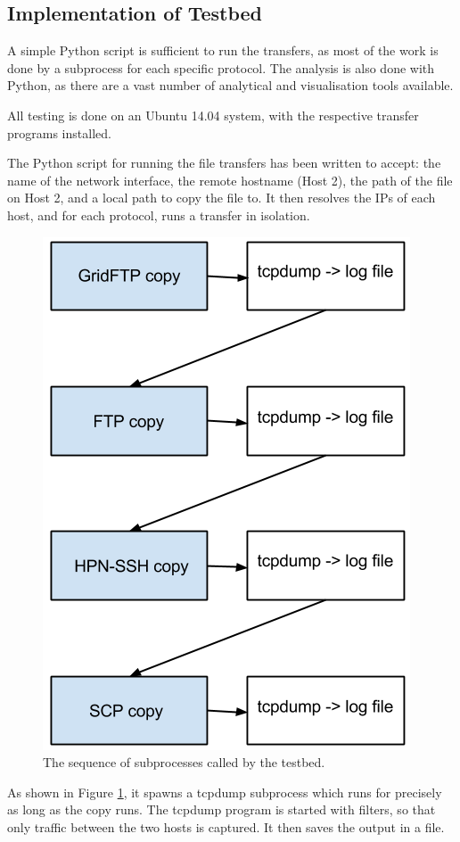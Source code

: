 \documentclass{sig-alternate-05-2015}
\begin{document}
\subsection{Implementation of Testbed}
A simple Python script is sufficient to run the transfers, as most of the work is done by a subprocess for each specific protocol. The analysis is also done with Python, as there are a vast number of analytical and visualisation tools available.

All testing is done on an Ubuntu 14.04 system, with the respective transfer programs installed. 

The Python script for running the file transfers has been written to accept: the name of the network interface, the remote hostname (Host 2), the path of the file on Host 2, and a local path to copy the file to.
It then resolves the IPs of each host, and for each protocol, runs a transfer in isolation. 
\begin{figure}[t]
	\centering
	\includegraphics[height=0.5\textheight]{img/seq_example}
	\caption{The sequence of subprocesses called by the testbed.
	         \label{fig:testbed_sequence}}
\end{figure}
As shown in Figure \ref{fig:testbed_sequence}, it spawns a tcpdump subprocess which runs for precisely as long as the copy runs. The tcpdump program is started with filters, so that only traffic between the two hosts is captured. It then saves the output in a file.
\end{document}
